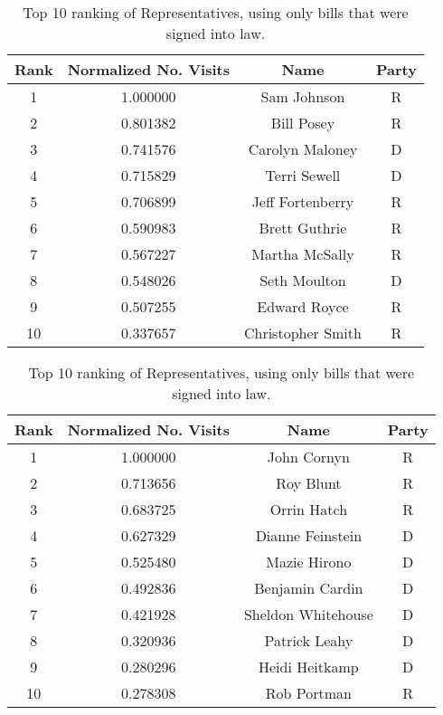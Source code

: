 \documentclass[11pt]{article}
\begin{document}
\begin{table}[h!]
\centering
 \begin{tabular}{|c | c |c |c|} 
 \hline
 Rank & Normalized No. Visits & Name & Party \\ [0.5ex] 
 \hline
1  & 1.000000 &Sam Johnson & R \\  
2  & 0.801382 &Bill Posey & R \\  
3  & 0.741576 &Carolyn Maloney & D \\  
4  & 0.715829 &Terri Sewell & D \\  
5  & 0.706899 &Jeff Fortenberry & R \\  
6  & 0.590983 &Brett Guthrie & R \\  
7  & 0.567227 &Martha McSally & R \\  
8  & 0.548026 &Seth Moulton & D \\  
9  & 0.507255 &Edward Royce & R \\  
10 &  0.337657 & Christopher Smith & R \\  
 \hline
 
\end{tabular}
\caption{Top 10 ranking of Representatives, using only bills that were signed into law.}
\label{table:experiment2}
\end{table}

\begin{table}[h!]
\centering
 \begin{tabular}{|c | c |c |c|} 
 \hline
 Rank & Normalized No. Visits & Name & Party \\ [0.5ex] 
 \hline
1 & 1.000000 & John Cornyn & R \\ 
2 & 0.713656 & Roy Blunt & R \\ 
3 & 0.683725 & Orrin Hatch & R \\ 
4 & 0.627329 & Dianne Feinstein & D \\ 
5 & 0.525480 & Mazie Hirono & D \\ 
6 & 0.492836 & Benjamin Cardin & D \\ 
7 & 0.421928 & Sheldon Whitehouse & D \\ 
8 & 0.320936 & Patrick Leahy & D \\ 
9 & 0.280296 & Heidi Heitkamp & D \\ 
10& 0.278308 & Rob Portman & R \\  \hline
 
\end{tabular}
\caption{Top 10 ranking of Representatives, using only bills that were signed into law.}
\label{table:experiment2_2}
\end{table}
 
\end{document}

